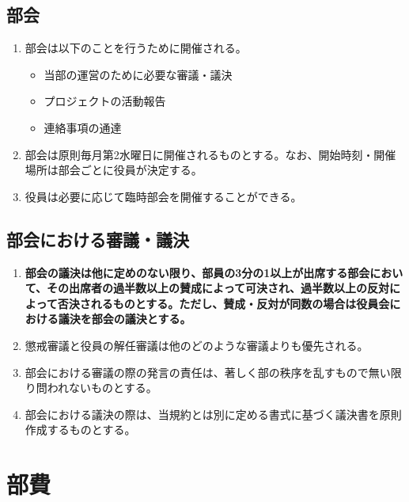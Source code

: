 \documentclass[12pt, unicode, a4paper]{ltjsreport}
\begin{document}
    \section{部会}\label{meeting}
        \begin{enumerate}
            \item 部会は以下のことを行うために開催される。
            \begin{itemize}
                \item 当部の運営のために必要な審議・議決
                \item プロジェクトの活動報告
                \item 連絡事項の通達
            \end{itemize}
            \item 部会は原則毎月第2水曜日に開催されるものとする。なお、開始時刻・開催場所は部会ごとに役員が決定する。
            \item 役員は必要に応じて臨時部会を開催することができる。
        \end{enumerate}

    \section{部会における審議・議決}\label{decision}
        \begin{enumerate}
            \item {\bf 部会の議決は他に定めのない限り、部員の3分の1以上が出席する部会において、その出席者の過半数以上の賛成によって可決され、過半数以上の反対によって否決されるものとする。ただし、賛成・反対が同数の場合は役員会における議決を部会の議決とする。}
            \item 懲戒審議と役員の解任審議は他のどのような審議よりも優先される。
            \item 部会における審議の際の発言の責任は、著しく部の秩序を乱すもので無い限り問われないものとする。
            \item 部会における議決の際は、当規約とは別に定める書式に基づく議決書を原則作成するものとする。
        \end{enumerate}


\chapter{部費}
\end{document}
